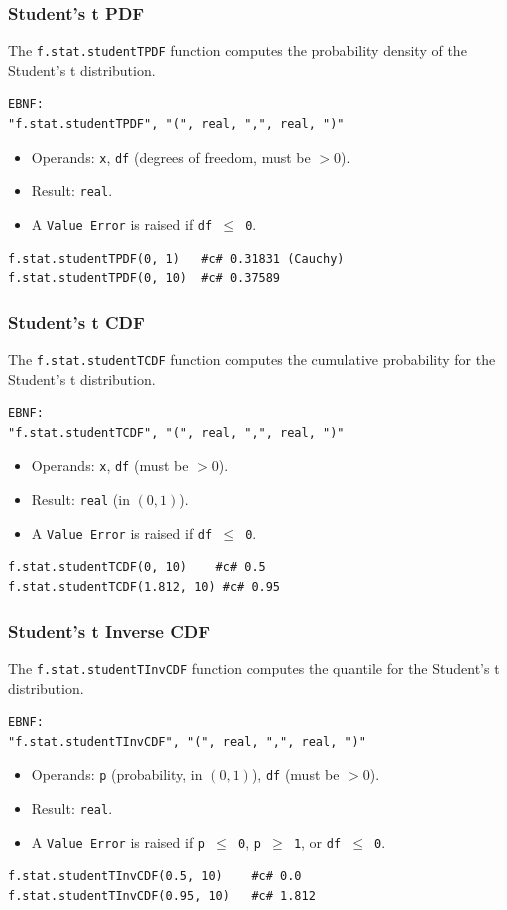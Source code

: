 \subsubsection{Student's t PDF}
The \texttt{f.stat.studentTPDF} function computes the probability density of the Student's t distribution.
\begin{verbatim}
EBNF:
"f.stat.studentTPDF", "(", real, ",", real, ")"
\end{verbatim}
\begin{itemize}
\item Operands: \texttt{x}, \texttt{df} (degrees of freedom, must be $> 0$).
\item Result: \texttt{real}.
\item A \texttt{Value Error} is raised if \texttt{df $\leq$ 0}.
\end{itemize}
\begin{verbatim}
f.stat.studentTPDF(0, 1)   #c# 0.31831 (Cauchy)
f.stat.studentTPDF(0, 10)  #c# 0.37589
\end{verbatim}

\subsubsection{Student's t CDF}
The \texttt{f.stat.studentTCDF} function computes the cumulative probability for the Student's t distribution.
\begin{verbatim}
EBNF:
"f.stat.studentTCDF", "(", real, ",", real, ")"
\end{verbatim}
\begin{itemize}
\item Operands: \texttt{x}, \texttt{df} (must be $> 0$).
\item Result: \texttt{real} (in $(0, 1)$).
\item A \texttt{Value Error} is raised if \texttt{df $\leq$ 0}.
\end{itemize}
\begin{verbatim}
f.stat.studentTCDF(0, 10)    #c# 0.5
f.stat.studentTCDF(1.812, 10) #c# 0.95
\end{verbatim}

\subsubsection{Student's t Inverse CDF}
The \texttt{f.stat.studentTInvCDF} function computes the quantile for the Student's t distribution.
\begin{verbatim}
EBNF:
"f.stat.studentTInvCDF", "(", real, ",", real, ")"
\end{verbatim}
\begin{itemize}
\item Operands: \texttt{p} (probability, in $(0, 1)$), \texttt{df} (must be $> 0$).
\item Result: \texttt{real}.
\item A \texttt{Value Error} is raised if \texttt{p $\leq$ 0}, \texttt{p $\geq$ 1}, or \texttt{df $\leq$ 0}.
\end{itemize}
\begin{verbatim}
f.stat.studentTInvCDF(0.5, 10)    #c# 0.0
f.stat.studentTInvCDF(0.95, 10)   #c# 1.812
\end{verbatim}

